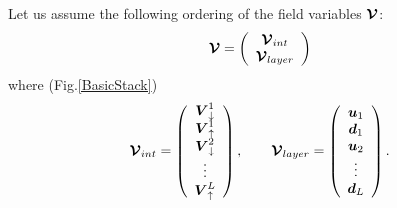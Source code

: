 Let us assume the following ordering of the field variables $\CB V$:
\begin{equation} \label{Xorder}
{\CB  V}=\left({\begin{array}{c}{\CB  V}_{{int}}\\
{\CB  V}_{{layer}}\end{array}}\right)
\end{equation}
where (Fig.\ref{BasicStack})
\begin{equation} \label{Xdef}
{\CB  V}_{{int}}=
\left({\begin{array}{c}
{{\bmi V}}_{ \downarrow }^{1}\\
{{\bmi V}}_{ \uparrow }^{1}\\
{{\bmi V}}_{ \downarrow }^{2}\\
\vdots\\
{{\bmi V}}_{ \uparrow }^{L}
\end{array}}\right), \qquad
{\CB  V}_{{layer}}=
\left({\begin{array}{c}
{\bmi  u}_{1}\\
{\bmi  d}_{1}\\
{\bmi  u}_{2}\\
\vdots\\
{\bmi  d}_{L}
\end{array}}\right).
\end{equation}


